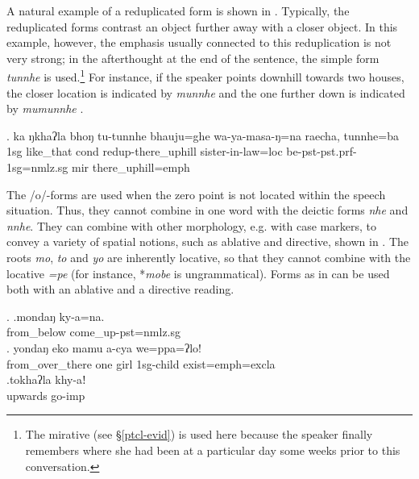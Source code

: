 A natural example of a reduplicated form is shown in \Next. Typically, the reduplicated forms contrast an object further away with a closer object. In this example, however, the emphasis usually connected to this reduplication is not very strong;  in the afterthought at  the end of the sentence, the simple form \emph{tunnhe} is used.\footnote{The mirative (see §\ref{ptcl-evid})  is used here because the speaker finally remembers where she had been at a particular day some weeks prior to this conversation.} For instance, if the speaker points downhill towards two houses, the closer location is indicated by \emph{munnhe}  and the one further down is indicated by \emph{mumunnhe} . 

	\exg. ka  ŋkhaʔla bhoŋ tu-tunnhe         bhauju=ghe               wa-ya-masa-ŋ=na                        raecha, tunnhe=ba\\
	{\sc 1sg} like\_that {\sc cond} {\sc redup}-there\_uphill sister-in-law{\sc =loc} be{\sc -pst-pst.prf-1sg=nmlz.sg} {\sc mir} there\_uphill{\sc =emph}\\
 


The /o/-forms are used when the zero point is not located within the speech situation. Thus, they cannot combine in one word with the deictic forms \emph{nhe} and \emph{nnhe}. They can combine with other morphology, e.g. with case markers, to convey a variety of spatial notions, such as ablative and directive, shown in \Next. The roots \emph{mo}, \emph{to} and \emph{yo} are inherently locative, so that they cannot combine with the locative \emph{=pe} (for instance, *\emph{mobe} is ungrammatical). Forms as in \Next[a] can be used both with an ablative and a directive reading.

\ex. \ag.mondaŋ ky-a=na.\\
from\_below come\_up{\sc [3sg]-pst=nmlz.sg}\\
\bg. yondaŋ    eko mamu a-cya            we=ppa=ʔlo!\\
from\_over\_there one girl {\sc 1sg-}child exist{\sc [3sg;npst]=emph=excla}\\
 
\bg.tokhaʔla khy-aǃ\\
upwards go{\sc -imp}\\

